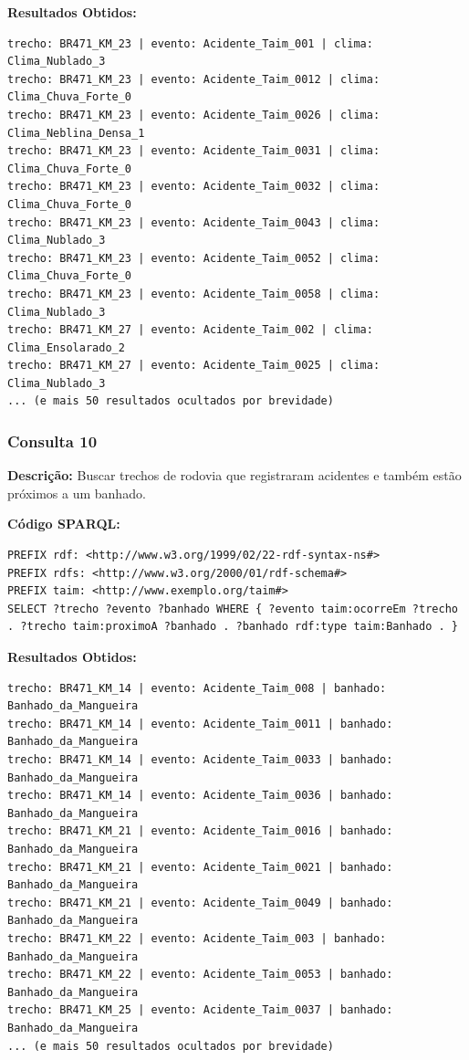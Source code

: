 \documentclass[12pt,a4paper]{article}
\begin{document}
\textbf{Resultados Obtidos:}
\begin{lstlisting}
trecho: BR471_KM_23 | evento: Acidente_Taim_001 | clima: Clima_Nublado_3
trecho: BR471_KM_23 | evento: Acidente_Taim_0012 | clima: Clima_Chuva_Forte_0
trecho: BR471_KM_23 | evento: Acidente_Taim_0026 | clima: Clima_Neblina_Densa_1
trecho: BR471_KM_23 | evento: Acidente_Taim_0031 | clima: Clima_Chuva_Forte_0
trecho: BR471_KM_23 | evento: Acidente_Taim_0032 | clima: Clima_Chuva_Forte_0
trecho: BR471_KM_23 | evento: Acidente_Taim_0043 | clima: Clima_Nublado_3
trecho: BR471_KM_23 | evento: Acidente_Taim_0052 | clima: Clima_Chuva_Forte_0
trecho: BR471_KM_23 | evento: Acidente_Taim_0058 | clima: Clima_Nublado_3
trecho: BR471_KM_27 | evento: Acidente_Taim_002 | clima: Clima_Ensolarado_2
trecho: BR471_KM_27 | evento: Acidente_Taim_0025 | clima: Clima_Nublado_3
... (e mais 50 resultados ocultados por brevidade)
\end{lstlisting}

\vspace{1cm}
\subsubsection*{Consulta 10}

\textbf{Descrição:} Buscar trechos de rodovia que registraram acidentes e também estão próximos a um banhado.

\textbf{Código SPARQL:}
\begin{lstlisting}
PREFIX rdf: <http://www.w3.org/1999/02/22-rdf-syntax-ns#>
PREFIX rdfs: <http://www.w3.org/2000/01/rdf-schema#>
PREFIX taim: <http://www.exemplo.org/taim#>
SELECT ?trecho ?evento ?banhado WHERE { ?evento taim:ocorreEm ?trecho . ?trecho taim:proximoA ?banhado . ?banhado rdf:type taim:Banhado . }
\end{lstlisting}

\textbf{Resultados Obtidos:}
\begin{lstlisting}
trecho: BR471_KM_14 | evento: Acidente_Taim_008 | banhado: Banhado_da_Mangueira
trecho: BR471_KM_14 | evento: Acidente_Taim_0011 | banhado: Banhado_da_Mangueira
trecho: BR471_KM_14 | evento: Acidente_Taim_0033 | banhado: Banhado_da_Mangueira
trecho: BR471_KM_14 | evento: Acidente_Taim_0036 | banhado: Banhado_da_Mangueira
trecho: BR471_KM_21 | evento: Acidente_Taim_0016 | banhado: Banhado_da_Mangueira
trecho: BR471_KM_21 | evento: Acidente_Taim_0021 | banhado: Banhado_da_Mangueira
trecho: BR471_KM_21 | evento: Acidente_Taim_0049 | banhado: Banhado_da_Mangueira
trecho: BR471_KM_22 | evento: Acidente_Taim_003 | banhado: Banhado_da_Mangueira
trecho: BR471_KM_22 | evento: Acidente_Taim_0053 | banhado: Banhado_da_Mangueira
trecho: BR471_KM_25 | evento: Acidente_Taim_0037 | banhado: Banhado_da_Mangueira
... (e mais 50 resultados ocultados por brevidade)
\end{lstlisting}
\end{document}
